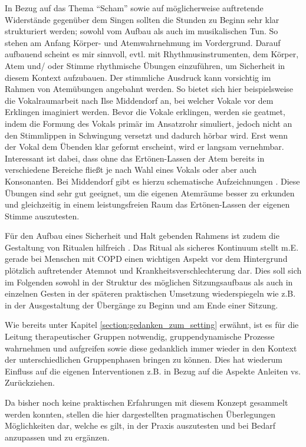 In Bezug auf das Thema "`Scham"' sowie auf möglicherweise auftretende Widerstände gegenüber dem Singen sollten die Stunden zu Beginn sehr klar strukturiert werden; sowohl vom Aufbau als auch im musikalischen Tun. So stehen am Anfang Körper- und Atemwahrnehmung im Vordergrund. Darauf aufbauend scheint es mir sinnvoll, evtl. mit Rhythmusinstrumenten, dem Körper, Atem und/ oder Stimme rhythmische Übungen einzuführen, um Sicherheit in diesem Kontext aufzubauen. Der stimmliche Ausdruck kann vorsichtig im Rahmen von Atemübungen angebahnt werden. So bietet sich hier beispielsweise die Vokalraumarbeit nach Ilse Middendorf an, bei welcher Vokale vor dem Erklingen imaginiert werden. Bevor die Vokale erklingen, werden sie geatmet, indem die Formung des Vokals primär im Ansatzrohr simuliert, jedoch nicht an den Stimmlippen in Schwingung versetzt und dadurch hörbar wird. Erst wenn der Vokal dem Übenden klar geformt erscheint, wird er langsam vernehmbar. Interessant ist dabei, dass ohne das Ertönen-Lassen der Atem bereits in verschiedene Bereiche fließt je nach Wahl eines Vokals oder aber auch Konsonanten. Bei Middendorf gibt es hierzu schematische Aufzeichnungen \autocite[vgl.][60ff.]{middendorf1995}. Diese Übungen sind sehr gut geeignet, um die eigenen Atemräume besser zu erkunden und gleichzeitig in einem leistungsfreien Raum das Ertönen-Lassen der eigenen Stimme auszutesten. 

Für den Aufbau eines Sicherheit und Halt gebenden Rahmens ist zudem die Gestaltung von Ritualen hilfreich \autocite[vgl.][31ff.]{deckervoigt2013}. Das Ritual als sicheres Kontinuum stellt m.E. gerade bei Menschen mit COPD einen wichtigen Aspekt vor dem Hintergrund plötzlich auftretender Atemnot und Krankheitsverschlechterung dar. Dies soll sich im Folgenden sowohl in der Struktur des möglichen Sitzungsaufbaus als auch in einzelnen Gesten in der späteren praktischen Umsetzung wiederspiegeln wie z.B. in der Ausgestaltung der Übergänge zu Beginn und am Ende einer Sitzung.

Wie bereits unter Kapitel \ref{section:gedanken_zum_setting} erwähnt, ist es für die Leitung therapeutischer Gruppen notwendig, gruppendynamische Prozesse wahrnehmen und aufgreifen sowie diese gedanklich immer wieder in den Kontext der unterschiedlichen Gruppenphasen bringen zu können. Dies hat wiederum Einfluss auf die eigenen Interventionen z.B. in Bezug auf die Aspekte Anleiten vs. Zurückziehen.

Da bisher noch keine praktischen Erfahrungen mit diesem Konzept gesammelt werden konnten, stellen die hier dargestellten pragmatischen Überlegungen Möglichkeiten dar, welche es gilt, in der Praxis auszutesten und bei Bedarf anzupassen und zu ergänzen. 

